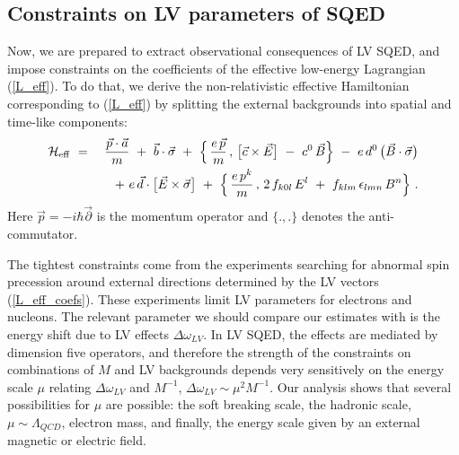 \documentclass[12pt]{revtex4}
\begin{document}
\subsection{Constraints on LV parameters of SQED}


Now, we are prepared to extract observational consequences of LV SQED,
and impose constraints on the coefficients of the effective low-energy
Lagrangian (\ref{L_eff}). To do that, we derive the non-relativistic
effective Hamiltonian corresponding to (\ref{L_eff}) by splitting the
external backgrounds into spatial and  time-like components: 
\begin{eqnarray}
        \mathcal{H}_{\rm eff} 
        & ~=~ &
        \frac{\vec{p} \cdot \vec{a}}
                  {m}
        ~+~
        \vec{b} \cdot \vec{\sigma}
        ~+~
        \Big\{\, 
                \frac{e\, \vec{p}}
                    {m}
                \, ,\, 
                \big[ \vec{c} \times \vec{E} \big]
                ~-~
                c^0\, \vec{B} 
        \Big\}
        ~-~ 
        e \, d^0 \, \big( \vec{B} \cdot \vec{\sigma} \big)
\nonumber        \\
\label{H_eff}
        & &
        ~+~
        e\, \vec{d} \cdot
        \big[ \vec{E} \times \vec{\sigma} \big]
        ~+~
        \Big\{\, 
                \frac{e\, p^k}
                    {m}
                \,,\, 
                2\, f_{k0l}\, E^l 
                ~+~
                f_{klm} \,\epsilon_{lmn}\, 
                B^n
        \Big\}~. 
\end{eqnarray}
%
Here $ \vec{p} = - i \hbar \vec{\partial} $ is the momentum operator
and $\{.,.\}$ denotes the anti-commutator. 


The tightest constraints come from the experiments searching for 
abnormal spin precession around external directions determined by the
LV vectors (\ref{L_eff_coefs}). These experiments limit LV parameters 
for electrons and nucleons. The relevant parameter we should compare 
our estimates with is the energy shift due to LV effects 
$\Delta \omega_{LV}$. In LV SQED, the effects are mediated by
dimension five operators, and therefore the strength of the
constraints on combinations of $M$ and LV backgrounds depends very
sensitively on the energy scale $\mu$ relating $\Delta \omega_{LV}$
and $M^{-1}$, $\Delta \omega_{LV} \sim \mu^2 M^{-1}$. Our analysis
shows that several possibilities for $\mu$ are possible: the soft
breaking scale, the hadronic scale, $\mu \sim \Lambda_{QCD}$, electron
mass, and finally, the energy scale given by an external magnetic or
electric field. 
\end{document}
